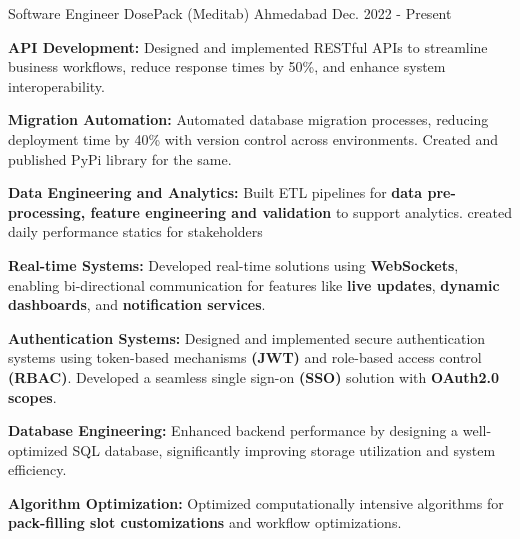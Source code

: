 \begin{cventries}
  \cventry
    {Software Engineer} %
    {DosePack (Meditab)} %
    {Ahmedabad} %
    {Dec. 2022 - Present} %
    {
      \begin{cvitems} %
        \item \textbf{API Development:} Designed and implemented RESTful APIs to streamline business workflows, reduce response times by 50\%, and enhance system interoperability.
        \vspace{0.4em}
        \item \textbf{Migration Automation:} Automated database migration processes, reducing deployment time by 40\% with version control across environments. Created and published PyPi library for the same.
        \item \textbf{Data Engineering and Analytics:} Built ETL pipelines for \textbf{ data pre-processing, feature engineering and validation} to support analytics. created daily performance statics for stakeholders 
        \vspace{0.4em}
        \item \textbf{Real-time Systems:} Developed real-time solutions using \textbf{WebSockets}, enabling bi-directional communication for features like \textbf{live updates}, \textbf{dynamic dashboards}, and \textbf{notification services}.
        \vspace{0.4em}
        \item \textbf{Authentication Systems:} Designed and implemented secure authentication systems using token-based mechanisms \textbf{(JWT)} and role-based access control \textbf{(RBAC)}. Developed a seamless single sign-on \textbf{(SSO)} solution with \textbf{OAuth2.0 scopes}.
        \vspace{0.4em}
        \item \textbf{Database Engineering:} Enhanced backend performance by designing a well-optimized SQL database, significantly improving storage utilization and system efficiency.
        \vspace{0.4em}
        \item \textbf{Algorithm Optimization:} Optimized computationally intensive algorithms for \textbf{pack-filling slot customizations} and workflow optimizations.
      \end{cvitems}
    }


\end{cventries}
